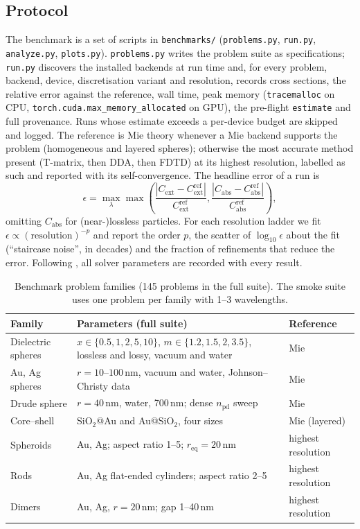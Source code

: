 \documentclass[11pt]{article}
\newcommand{\code}[1]{\texttt{#1}}
\newcommand{\npd}{n_\mathrm{pd}}
\begin{document}
\subsection{Protocol}
The benchmark is a set of scripts in \code{benchmarks/} (\code{problems.py}, \code{run.py},
\code{analyze.py}, \code{plots.py}). \code{problems.py} writes the problem suite as specifications;
\code{run.py} discovers the installed backends at run time and, for every problem, backend, device,
discretisation variant and resolution, records cross sections, the relative error against the
reference, wall time, peak memory (\code{tracemalloc} on CPU, \code{torch.cuda.max\_memory\_allocated}
on GPU), the pre-flight \code{estimate} and full provenance. Runs whose estimate exceeds a per-device
budget are skipped and logged. The reference is Mie theory whenever a Mie backend supports the
problem (homogeneous and layered spheres); otherwise the most accurate method present (T-matrix,
then DDA, then FDTD) at its highest resolution, labelled as such and reported with its
self-convergence. The headline error of a run is
\begin{equation}
  \epsilon = \max_{\lambda}\max\left(\frac{|C_\mathrm{ext}-C_\mathrm{ext}^\mathrm{ref}|}{C_\mathrm{ext}^\mathrm{ref}},
  \frac{|C_\mathrm{abs}-C_\mathrm{abs}^\mathrm{ref}|}{C_\mathrm{abs}^\mathrm{ref}}\right),
\end{equation}
omitting $C_\mathrm{abs}$ for (near-)lossless particles. For each resolution ladder we fit
$\epsilon\propto(\text{resolution})^{-p}$ and report the order $p$, the scatter of $\log_{10}\epsilon$
about the fit (``staircase noise'', in decades) and the fraction of refinements that reduce the
error. Following \cite{Argentin2026ddabench}, all solver parameters are recorded with every result.

\begin{table}[t]
\centering\small
\begin{tabularx}{\linewidth}{@{}lXl@{}}
\toprule
Family & Parameters (full suite) & Reference \\
\midrule
Dielectric spheres & $x\in\{0.5,1,2,5,10\}$, $m\in\{1.2,1.5,2,3.5\}$, lossless and lossy, vacuum and water & Mie \\
Au, Ag spheres & $r=10$--$100$\,nm, vacuum and water, Johnson--Christy data \cite{JohnsonChristy1972} & Mie \\
Drude sphere & $r=40$\,nm, water, 700\,nm; dense $\npd$ sweep & Mie \\
Core--shell & SiO$_2$@Au and Au@SiO$_2$, four sizes & Mie (layered) \\
Spheroids & Au, Ag; aspect ratio 1--5; $r_\mathrm{eq}=20$\,nm & highest resolution \\
Rods & Au, Ag flat-ended cylinders; aspect ratio 2--5 & highest resolution \\
Dimers & Au, Ag, $r=20$\,nm; gap 1--40\,nm & highest resolution \\
\bottomrule
\end{tabularx}
\caption{Benchmark problem families (145 problems in the full suite). The smoke suite uses one
problem per family with 1--3 wavelengths.}
\label{tab:suite}
\end{table}
\end{document}

